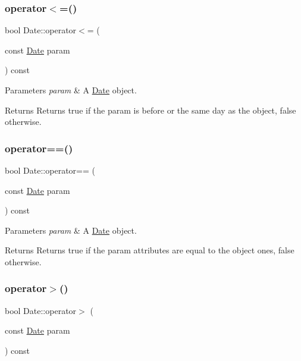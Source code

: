 \subsubsection{\texorpdfstring{operator$<$=()}{operator<=()}}
{\footnotesize\ttfamily bool Date\+::operator$<$= (\begin{DoxyParamCaption}\item[{const \hyperlink{classDate}{Date}}]{param }\end{DoxyParamCaption}) const}


\begin{DoxyParams}{Parameters}
{\em param} & A \hyperlink{classDate}{Date} object. \\
\hline
\end{DoxyParams}
\begin{DoxyReturn}{Returns}
Returns true if the param is before or the same day as the object, false otherwise. 
\end{DoxyReturn}
\mbox{\label{classDate_a7d37117367e4067ca6ff8acaf5016703}} 
\subsubsection{\texorpdfstring{operator==()}{operator==()}}
{\footnotesize\ttfamily bool Date\+::operator== (\begin{DoxyParamCaption}\item[{const \hyperlink{classDate}{Date}}]{param }\end{DoxyParamCaption}) const}


\begin{DoxyParams}{Parameters}
{\em param} & A \hyperlink{classDate}{Date} object. \\
\hline
\end{DoxyParams}
\begin{DoxyReturn}{Returns}
Returns true if the param attributes are equal to the object ones, false otherwise. 
\end{DoxyReturn}
\mbox{\label{classDate_a8c20d34bc39224293930711da08c4230}} 
\subsubsection{\texorpdfstring{operator$>$()}{operator>()}}
{\footnotesize\ttfamily bool Date\+::operator$>$ (\begin{DoxyParamCaption}\item[{const \hyperlink{classDate}{Date}}]{param }\end{DoxyParamCaption}) const}


